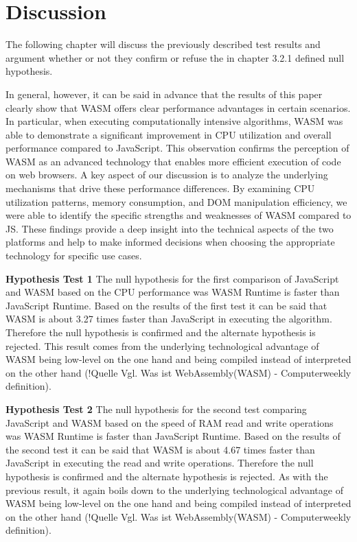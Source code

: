 \newpage
\section{Discussion} \label{discussion}
The following chapter will discuss the previously described test results and argument whether or not they confirm or refuse the in chapter 3.2.1 defined null hypothesis. 

In general, however, it can be said in advance that the results of this paper clearly show that WASM offers clear performance advantages in certain scenarios. In particular, when executing computationally intensive algorithms, WASM was able to demonstrate a significant improvement in CPU utilization and overall performance compared to JavaScript. This observation confirms the perception of WASM as an advanced technology that enables more efficient execution of code on web browsers. 
A key aspect of our discussion is to analyze the underlying mechanisms that drive these performance differences. By examining CPU utilization patterns, memory consumption, and DOM manipulation efficiency, we were able to identify the specific strengths and weaknesses of WASM compared to JS. These findings provide a deep insight into the technical aspects of the two platforms and help to make informed decisions when choosing the appropriate technology for specific use cases.

\textbf{Hypothesis Test 1} \newline
The null hypothesis for the first comparison of JavaScript and WASM based on the CPU performance was \dq WASM Runtime is faster than JavaScript Runtime\dq . Based on the results of the first test it can be said that WASM is about 3.27 times faster than JavaScript in executing the algorithm. Therefore the null hypothesis is confirmed and the alternate hypothesis is rejected. This result comes from the underlying technological advantage of WASM being low-level on the one hand and being compiled instead of interpreted on the other hand (!Quelle Vgl. Was ist WebAssembly(WASM) - Computerweekly definition).

\textbf{Hypothesis Test 2} \newline
The null hypothesis for the second test comparing JavaScript and WASM based on the speed of RAM read and write operations was \dq WASM Runtime is faster than JavaScript Runtime\dq . Based on the results of the second test it can be said that WASM is about 4.67 times faster than JavaScript in executing the read and write operations. Therefore the null hypothesis is confirmed and the alternate hypothesis is rejected. As with the previous result, it again boils down to the underlying technological advantage of WASM being low-level on the one hand and being compiled instead of interpreted on the other hand (!Quelle Vgl. Was ist WebAssembly(WASM) - Computerweekly definition).

